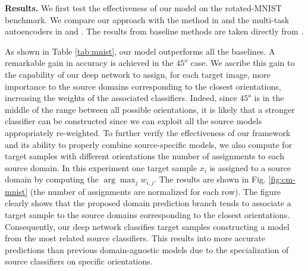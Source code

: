 \documentclass{article}
\newcommand{\myparagraph}[1]{\vspace{5pt}\noindent\textbf{#1}}
\begin{document}
\vspace{-0.2em}
\myparagraph{Results.} 
We first test the effectiveness of our model on the rotated-MNIST benchmark. We compare our approach with the method in \cite{motiian2017unified} and the multi-task autoencoders in \cite{ghifary2015domain} and \cite{rifaiexplicit}. The results from baseline methods are taken directly from \cite{motiian2017unified}.
\begin{table}[t]
			\caption{Rotated-MNIST dataset: comparison with previous methods. } 
		\centering
		\label{tab:mnist}
        \vspace{-0.25cm}
\end{table}
As shown in Table \ref{tab:mnist}, our model outperforms all the baselines. A remarkable gain in accuracy is achieved in the $45^o$ case. We ascribe this gain to the capability of our deep network to assign, for each target image, more importance to the source domains corresponding to the closest orientations, increasing the weights of the associated classifiers. Indeed, since $45^o$ is in the middle of the range between all possible orientations, it is likely that a stronger classifier can be constructed since we can exploit all the source models appropriately re-weighted. To further verify the effectiveness of our framework and its ability to properly combine source-specific models, we also compute for target samples with different orientations the number of assignments to each source domain. In this experiment one target sample $x_i$ is assigned to a source domain by computing the $\arg \max_j w_{i,j}$. The results are shown in Fig. \ref{fig:cm-mnist} (the number of assignments are normalized for each row). The figure clearly shows that the proposed domain prediction branch tends to associate a target sample to the source domains corresponding to the closest orientations. Consequently, our deep network classifies target samples constructing a model from the most related source classifiers. This results into more accurate predictions than previous domain-agnostic models due to the specialization of source classifiers on specific orientations. 
\end{document}
